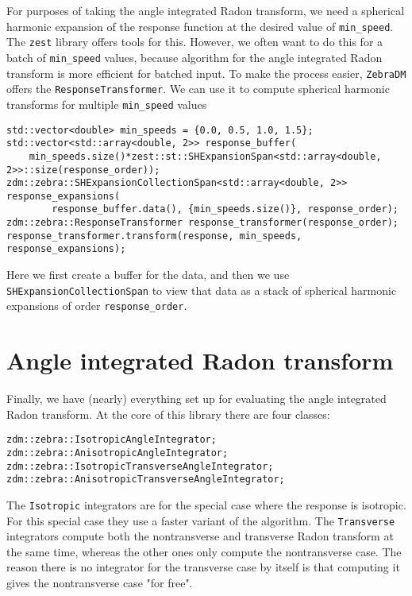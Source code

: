 \documentclass{article}
\begin{document}
For purposes of taking the angle integrated Radon transform, we need a spherical harmonic expansion of the response function at the desired value of \texttt{min_speed}. The \texttt{zest} library offers tools for this. However, we often want to do this for a batch of \texttt{min_speed} values, because algorithm for the angle integrated Radon transform is more efficient for batched input. To make the process easier, \texttt{ZebraDM} offers the \texttt{ResponseTransformer}. We can use it to compute spherical harmonic transforms for multiple \texttt{min_speed} values
\begin{verbatim}
std::vector<double> min_speeds = {0.0, 0.5, 1.0, 1.5};
std::vector<std::array<double, 2>> response_buffer(
    min_speeds.size()*zest::st::SHExpansionSpan<std::array<double, 2>>::size(response_order));
zdm::zebra::SHExpansionCollectionSpan<std::array<double, 2>>
response_expansions(
        response_buffer.data(), {min_speeds.size()}, response_order);
zdm::zebra::ResponseTransformer response_transformer(response_order);
response_transformer.transform(response, min_speeds, response_expansions);
\end{verbatim}
Here we first create a buffer for the data, and then we use \texttt{SHExpansionCollectionSpan} to view that data as a stack of spherical harmonic expansions of order \texttt{response_order}.

\section{Angle integrated Radon transform}

Finally, we have (nearly) everything set up for evaluating the angle integrated Radon transform. At the core of this library there are four classes:
\begin{verbatim}
zdm::zebra::IsotropicAngleIntegrator;
zdm::zebra::AnisotropicAngleIntegrator;
zdm::zebra::IsotropicTransverseAngleIntegrator;
zdm::zebra::AnisotropicTransverseAngleIntegrator;
\end{verbatim}
The \texttt{Isotropic} integrators are for the special case where the response is isotropic. For this special case they use a faster variant of the algorithm. 
The \texttt{Transverse} integrators compute both the nontransverse and transverse Radon transform at the same time, whereas the other ones only compute the nontransverse case. The reason there is no integrator for the transverse case by itself is that computing it gives the nontransverse case "for free". 
\end{document}
